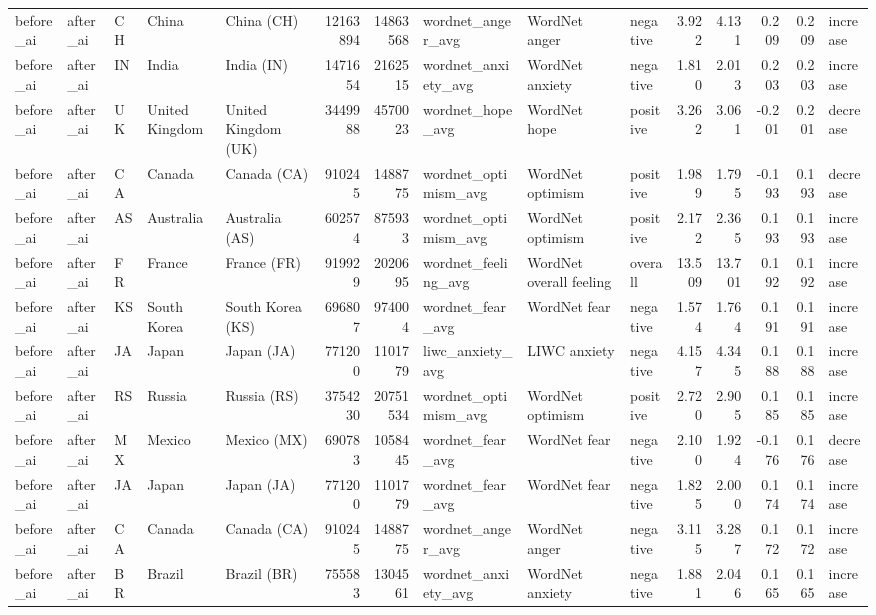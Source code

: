 \begin{tabular}{lllllrrlllrrrrl}
before\_ai & after\_ai & CH & China & China (CH) & 12163894 & 14863568 & wordnet\_anger\_avg & WordNet anger & negative & 3.922 & 4.131 & 0.209 & 0.209 & increase \\
before\_ai & after\_ai & IN & India & India (IN) & 1471654 & 2162515 & wordnet\_anxiety\_avg & WordNet anxiety & negative & 1.810 & 2.013 & 0.203 & 0.203 & increase \\
before\_ai & after\_ai & UK & United Kingdom & United Kingdom (UK) & 3449988 & 4570023 & wordnet\_hope\_avg & WordNet hope & positive & 3.262 & 3.061 & -0.201 & 0.201 & decrease \\
before\_ai & after\_ai & CA & Canada & Canada (CA) & 910245 & 1488775 & wordnet\_optimism\_avg & WordNet optimism & positive & 1.989 & 1.795 & -0.193 & 0.193 & decrease \\
before\_ai & after\_ai & AS & Australia & Australia (AS) & 602574 & 875933 & wordnet\_optimism\_avg & WordNet optimism & positive & 2.172 & 2.365 & 0.193 & 0.193 & increase \\
before\_ai & after\_ai & FR & France & France (FR) & 919929 & 2020695 & wordnet\_feeling\_avg & WordNet overall feeling & overall & 13.509 & 13.701 & 0.192 & 0.192 & increase \\
before\_ai & after\_ai & KS & South Korea & South Korea (KS) & 696807 & 974004 & wordnet\_fear\_avg & WordNet fear & negative & 1.574 & 1.764 & 0.191 & 0.191 & increase \\
before\_ai & after\_ai & JA & Japan & Japan (JA) & 771200 & 1101779 & liwc\_anxiety\_avg & LIWC anxiety & negative & 4.157 & 4.345 & 0.188 & 0.188 & increase \\
before\_ai & after\_ai & RS & Russia & Russia (RS) & 3754230 & 20751534 & wordnet\_optimism\_avg & WordNet optimism & positive & 2.720 & 2.905 & 0.185 & 0.185 & increase \\
before\_ai & after\_ai & MX & Mexico & Mexico (MX) & 690783 & 1058445 & wordnet\_fear\_avg & WordNet fear & negative & 2.100 & 1.924 & -0.176 & 0.176 & decrease \\
before\_ai & after\_ai & JA & Japan & Japan (JA) & 771200 & 1101779 & wordnet\_fear\_avg & WordNet fear & negative & 1.825 & 2.000 & 0.174 & 0.174 & increase \\
before\_ai & after\_ai & CA & Canada & Canada (CA) & 910245 & 1488775 & wordnet\_anger\_avg & WordNet anger & negative & 3.115 & 3.287 & 0.172 & 0.172 & increase \\
before\_ai & after\_ai & BR & Brazil & Brazil (BR) & 755583 & 1304561 & wordnet\_anxiety\_avg & WordNet anxiety & negative & 1.881 & 2.046 & 0.165 & 0.165 & increase \\

\end{tabular}
